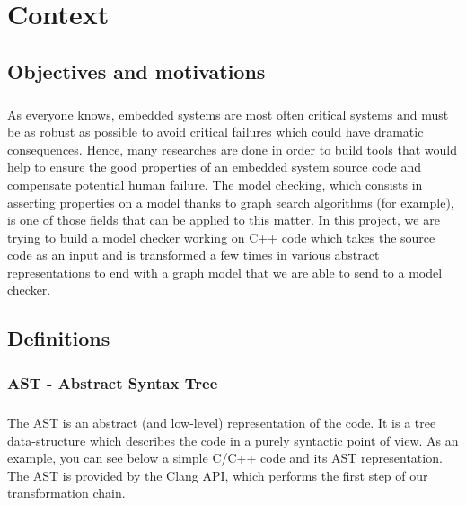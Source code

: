\documentclass{report}
\begin{document}
\chapter{Context}

\section{Objectives and motivations}

\paragraph{}
\hspace{4mm}\textnormal{As everyone knows, embedded systems are most often critical systems and must be as robust as possible to avoid critical failures which could have dramatic consequences.
Hence, many researches are done in order to build tools that would help to ensure the good properties of an embedded system source code and compensate potential human
failure. The model checking, which consists in asserting properties on a model thanks to graph search algorithms (for example), is one of those fields that can be
applied to this matter. In this project, we are trying to build a model checker working on C++ code which takes the source code as an input and is transformed a few times
in various abstract representations to end with a graph model that we are able to send to a model checker.}

\section{Definitions}

\subsection{AST - Abstract Syntax Tree}

\paragraph{}
\hspace{4mm}\textnormal{The AST is an abstract (and low-level) representation of the code. It is a tree data-structure which describes the code in a purely syntactic point of view. As an example,
you can see below a simple C/C++ code and its AST representation. The AST is provided by the Clang API, which performs the first step of our
transformation chain.}
\end{document}

